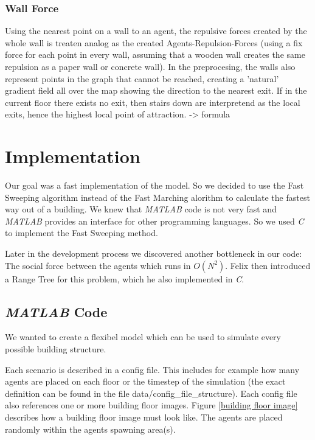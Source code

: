 \documentclass[11pt]{article}
\begin{document}
\subsubsection{Wall Force}

Using the nearest point on a wall to an agent, the repulsive forces created by
the whole wall is treaten analog as the created Agents-Repulsion-Forces (using a
fix force for each point in every wall, assuming that a wooden wall creates the
same repulsion as a paper wall or concrete wall). In the preprocesing, the walls
also represent points in the graph that cannot be reached, creating a 'natural'
gradient field all over the map showing the direction to the nearest exit. If in
the current floor there exists no exit, then stairs down are interpretend as the
local exits, hence the highest local point of attraction. \cite{SFMPD} 
-> formula




\section{Implementation}
Our goal was a fast implementation of the model. So we decided to use the Fast
Sweeping algorithm instead of the Fast Marching alorithm to calculate the
fastest way out of a building. We knew that \textit{MATLAB} code is not very fast and
\textit{MATLAB} provides an interface for other programming languages. So we
used \textit{C} to
implement the Fast Sweeping method.

Later in the development process we discovered another bottleneck in our code:
The social force between the agents which runs in $ O(N^2) $. Felix then
introduced a Range Tree for this problem, which he also implemented in
\textit{C}.

\subsection{\textit{MATLAB} Code} \label{matlab code}
We wanted to create a flexibel model which can be used to simulate every
possible building structure. 

Each scenario is described in a config file. This includes for example how many
agents are placed on each floor or the timestep of the simulation (the exact
definition can be found in the file data/config\_file\_structure). Each config
file also references one or more building floor images.
Figure \vref{building floor image} describes how a building floor
image must look like. The agents are placed randomly within the agents spawning
area(s).
\end{document}
